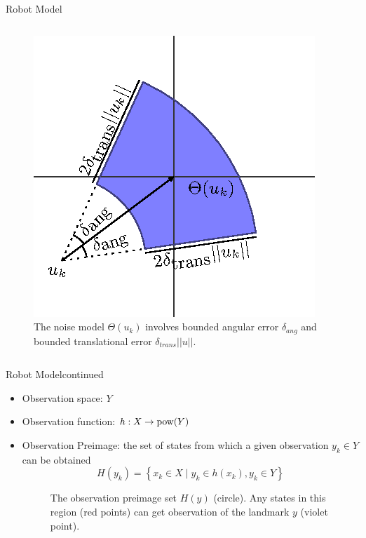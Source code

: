 \begin{frame}{Robot Model}
\begin{itemize}
\begin{columns}
\begin{column}{0.5\textwidth}
\begin{figure}
            \centering
            \includegraphics[scale=0.55]{figs/noisemodel}
            \caption{\scriptsize{The noise model $\Theta(u_k)$ involves bounded
                angular error $\delta_{ang}$ and bounded translational error
                $\delta_{trans}||u||$.}}
            \label{fig:noiseModel}
          \end{figure}
        \end{column}
    \end{columns}
\end{itemize}
  	
\end{frame}

\begin{frame}{Robot Model}{continued}
  \begin{itemize}
  \item Observation space: $Y$
  \item Observation function: $h : X \to \operatorname{pow}(Y) $
  \item Observation Preimage: the set of states from which a given observation
    $y_k \in Y$ can be obtained
  \begin{equation}
    H(y_k) = \left\{ x_k \in X \mid y_k \in h(x_k), y_k \in Y \right\}
  \end{equation}
 
  \begin{figure}
    \centering
  \caption{\scriptsize{The observation preimage set $H(y)$ (circle). Any states in this
    region (red points) can get observation of the landmark $y$ (violet
    point).}}
\end{figure}
\end{itemize}
\end{frame}

